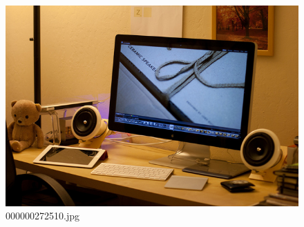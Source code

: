 \begin{figure}[h]
    \centering
    \includegraphics[width=0.8\linewidth]{../image set/hard/000000272510.jpg}
    \caption{000000272510.jpg}
\end{figure}
